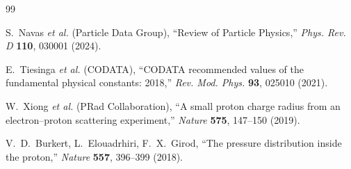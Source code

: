 \documentclass[12pt,a4paper]{article}
\begin{document}
	\begin{thebibliography}{99}
		
		S.~Navas \textit{et al.} (Particle Data Group), ``Review of Particle Physics,'' \textit{Phys. Rev. D} \textbf{110}, 030001 (2024).
		
		E.~Tiesinga \textit{et al.} (CODATA), ``CODATA recommended values of the fundamental physical constants: 2018,'' \textit{Rev. Mod. Phys.} \textbf{93}, 025010 (2021).
		
		W.~Xiong \textit{et al.} (PRad Collaboration), ``A small proton charge radius from an electron–proton scattering experiment,'' \textit{Nature} \textbf{575}, 147--150 (2019).
		
		V.~D.~Burkert, L.~Elouadrhiri, F.~X.~Girod, ``The pressure distribution inside the proton,'' \textit{Nature} \textbf{557}, 396--399 (2018).
		
	\end{thebibliography}
	
\end{document}
